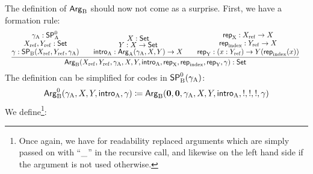 \documentclass{schwicht}
\begin{document}
The definition of $\mathsf{Arg}_{\mathrm{B}}$ should now not come as a surprise. First, we have a formation rule:
%
\[
\resizebox{\textwidth}{!}{%
$
\infer{\ArgB(\Xref, \Yref, \gammaA, \A, \B, \introA, \repA, \repIndex, \repB, \gamma) : \Set}
             {\deduce{\gamma : \SPB(\Xref, \Yref, \gammaA)}
                     {\deduce{\Xref, \Yref : \Set}{\gammaA : \SPAp}}
      & \quad \deduce{\introA : \ArgA(\gammaA, \A, \B) \to \A}
                     {\deduce{\B : \A \to \Set}{\A : \Set}}
              & \quad \deduce{\repB: (x : \Yref) \to \B(\repIndex(x))}
                             {\deduce{\repIndex : \Yref \to \A}
                                     {\repA : \Xref \to \A}}}
$
}
\]
%
The definition can be simplified for codes in $\mathsf{SP}^{0}_{\mathrm{B}}(\gamma_{\mathrm{A}})$:
\[
\mathsf{Arg}^{0}_{\mathrm{B}}(\gamma_{\mathrm{A}}, X, Y, \mathsf{intro}_{\mathrm{A}}, \gamma) \coloneqq
   \mathsf{Arg}_{\mathrm{B}}(\mathbf{0}, \mathbf{0}, \gamma_{\mathrm{A}}, X, Y, \mathsf{intro}_{\mathrm{A}}, !, !, !, \gamma)
\]
%
We define\footnote{Once again, we have for readability
  replaced arguments which are simply passed on with ``$\_$'' in
  the recursive call, and likewise on the left hand side if the
  argument is not used otherwise.}:
%
\end{document}
